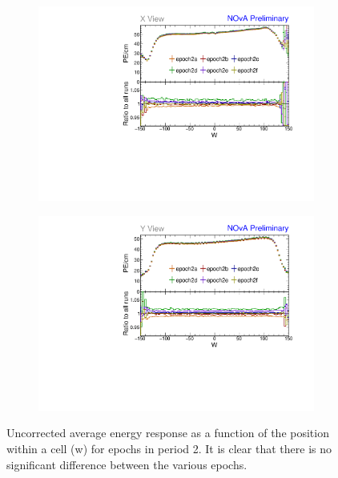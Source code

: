 \begin{figure}[h]
\centering
\begin{subfigure}[b]{0.495\textwidth}
\centering
\includegraphics[width=\textwidth]{PlotsTBCalibTechnote/Attenprofs_P2Data_WPE_corr_xy_X_Combined.pdf}
\end{subfigure}
\begin{subfigure}[b]{0.495\textwidth}
\centering
\includegraphics[width=\textwidth]{PlotsTBCalibTechnote/Attenprofs_P2Data_WPE_corr_xy_Y_Combined.pdf}
\end{subfigure}
\caption{Uncorrected average energy response as a function of the position within a cell (w) for epochs in period 2. It is clear that there is no significant difference between the various epochs.}
\label{fig:CalibhistWPE_period2}
\end{figure}

